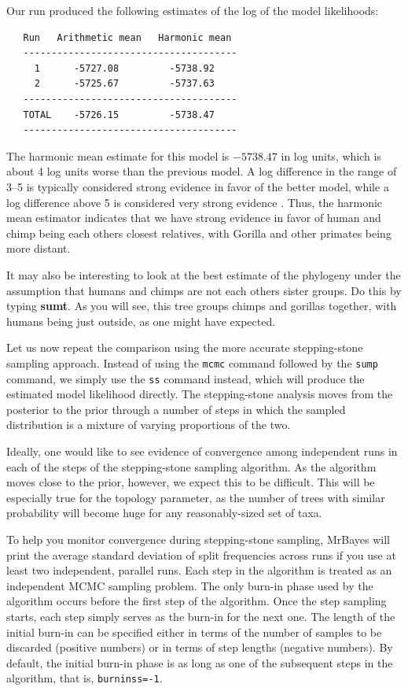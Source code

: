 \documentclass[12pt]{book}
\newcommand{\ttt}[1]{\texttt{#1}}
\begin{document}
Our run produced the following estimates of the log of the model likelihoods:

\begin{singlespacing}
\begin{verbatim}
   Run   Arithmetic mean   Harmonic mean
   --------------------------------------
     1      -5727.08         -5738.92
     2      -5725.67         -5737.63
   --------------------------------------
   TOTAL    -5726.15         -5738.47
   --------------------------------------
\end{verbatim}
\end{singlespacing}

The harmonic mean estimate for this model is $-5738.47$ in log units, which is about 4 log units
worse than the previous model. A log difference in the range of 3--5 is typically considered strong
evidence in favor of the better model, while a log difference above 5 is considered very strong
evidence \citep{kass95}. Thus, the harmonic mean estimator indicates that we have strong evidence
in favor of human and chimp being each others closest relatives, with Gorilla and other primates
being more distant.

It may also be interesting to look at the best estimate of the phylogeny under the assumption that
humans and chimps are not each others sister groups. Do this by typing \textbf{sumt}. As you will
see, this tree groups chimps and gorillas together, with humans being just outside, as one might
have expected.

Let us now repeat the comparison using the more accurate stepping-stone sampling approach. Instead
of using the \ttt{mcmc} command followed by the \ttt{sump} command, we simply use the \ttt{ss}
command instead, which will produce the estimated model likelihood directly. The stepping-stone
analysis moves from the posterior to the prior through a number of steps in which the sampled
distribution is a mixture of varying proportions of the two.

Ideally, one would like to see evidence of convergence among independent runs in each of the steps
of the stepping-stone sampling algorithm. As the algorithm moves close to the prior, however, we
expect this to be difficult. This will be especially true for the topology parameter, as the number
of trees with similar probability will become huge for any reasonably-sized set of taxa.

To help you monitor convergence during stepping-stone sampling, MrBayes will print the average
standard deviation of split frequencies across runs if you use at least two independent, parallel
runs. Each step in the algorithm is treated as an independent MCMC sampling problem. The only
burn-in phase used by the algorithm occurs before the first step of the algorithm. Once the step
sampling starts, each step simply serves as the burn-in for the next one. The length of the initial
burn-in can be specified either in terms of the number of samples to be discarded (positive
numbers) or in terms of step lengths (negative numbers). By default, the initial burn-in phase is
as long as one of the subsequent steps in the algorithm, that is, \ttt{burninss=-1}.
\end{document}
